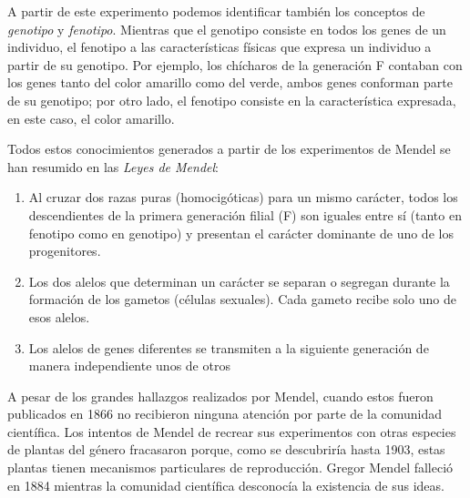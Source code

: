 
A partir de este experimento podemos identificar también los conceptos de \emph{genotipo} y \emph{fenotipo}. Mientras que el genotipo consiste en todos los genes de un individuo, el fenotipo a las características físicas que expresa un individuo a partir de su genotipo.\citep{delcastilloruizGeneticaClinica2019} Por ejemplo, los chícharos de la generación F contaban con los genes tanto del color amarillo como del verde, ambos genes conforman parte de su genotipo; por otro lado, el fenotipo consiste en la característica expresada, en este caso, el color amarillo.

Todos estos conocimientos generados a partir de los experimentos de Mendel se han resumido en las \emph{Leyes de Mendel}:

\begin{enumerate}
    \item Al cruzar dos razas puras (homocigóticas) para un mismo carácter, todos los descendientes de la primera generación filial (F) son iguales entre sí (tanto en fenotipo como en genotipo) y presentan el carácter dominante de uno de los progenitores.
    \item Los dos alelos que determinan un carácter se separan o segregan durante la formación de los gametos (células sexuales). Cada gameto recibe solo uno de esos alelos.
    \item Los alelos de genes diferentes se transmiten a la siguiente generación de manera independiente unos de otros
\end{enumerate}



A pesar de los grandes hallazgos realizados por Mendel, cuando estos fueron publicados en 1866 no recibieron ninguna atención por parte de la comunidad científica. Los intentos de Mendel de recrear sus experimentos con otras especies de plantas del género  fracasaron porque, como se descubriría hasta 1903, estas plantas tienen mecanismos particulares de reproducción. Gregor Mendel falleció en 1884 mientras la comunidad científica desconocía la existencia de sus ideas.

